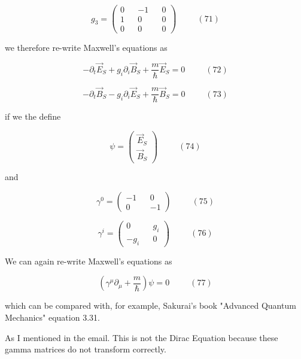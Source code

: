\documentclass {article}
\begin{document}
$$g_3 = \left(\begin{matrix}  0 && -1 && 0 \\ 1 && 0 && 0 \\ 0 && 0 && 0 \end{matrix}\right) ~~~~~~~~~~~ (71)$$

we therefore re-write Maxwell's equations as 

$$-\partial_t \vec E_S + g_i \partial_i \vec B_S   +\frac m {\hbar} \vec E_S = 0 ~~~~~~~~~~~ (72)$$ 

$$ -\partial_t \vec B_S - g_i \partial_i \vec E_S   +\frac m {\hbar} \vec B_S = 0 ~~~~~~~~~~~ (73)$$ 

if we the define 

$$\psi = \left(\begin{matrix}  \vec E_S \\ \vec B_S \end{matrix}\right) ~~~~~~~~~~~ (74)$$

and 

$$\gamma^0 = \left(\begin{matrix}  -1 && 0 \\ 0 && -1 \end{matrix}\right) ~~~~~~~~~~~ (75)$$

$$\gamma^i = \left(\begin{matrix}  0 && g_i \\ -g_i && 0 \end{matrix}\right) ~~~~~~~~~~~ (76)$$

We can again re-write Maxwell's equations as

$$\left(\gamma^{\mu} \partial_{\mu} + \frac m {\hbar} \right) \psi = 0 ~~~~~~~~~~~ (77)$$

which can be compared with, for example, Sakurai's book "Advanced Quantum Mechanics" equation 3.31.

As I mentioned in the email. This is not the Dirac Equation because these gamma matrices do not transform correctly.
\end{document}
